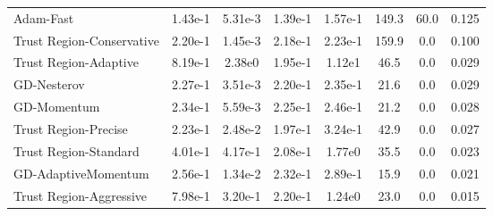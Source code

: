 \documentclass{article}
\begin{document}
\begin{table}[htbp]
{\begin{tabular}{p{2.5cm}*{7}{c}}
Adam-Fast & 1.43e-1 & 5.31e-3 & 1.39e-1 & 1.57e-1 & 149.3 & 60.0 & 0.125 \\
Trust Region-Conservative & 2.20e-1 & 1.45e-3 & 2.18e-1 & 2.23e-1 & 159.9 & 0.0 & 0.100 \\
Trust Region-Adaptive & 8.19e-1 & 2.38e0 & 1.95e-1 & 1.12e1 & 46.5 & 0.0 & 0.029 \\
GD-Nesterov & 2.27e-1 & 3.51e-3 & 2.20e-1 & 2.35e-1 & 21.6 & 0.0 & 0.029 \\
GD-Momentum & 2.34e-1 & 5.59e-3 & 2.25e-1 & 2.46e-1 & 21.2 & 0.0 & 0.028 \\
Trust Region-Precise & 2.23e-1 & 2.48e-2 & 1.97e-1 & 3.24e-1 & 42.9 & 0.0 & 0.027 \\
Trust Region-Standard & 4.01e-1 & 4.17e-1 & 2.08e-1 & 1.77e0 & 35.5 & 0.0 & 0.023 \\
GD-AdaptiveMomentum & 2.56e-1 & 1.34e-2 & 2.32e-1 & 2.89e-1 & 15.9 & 0.0 & 0.021 \\
Trust Region-Aggressive & 7.98e-1 & 3.20e-1 & 2.20e-1 & 1.24e0 & 23.0 & 0.0 & 0.015 \\
\bottomrule
\end{tabular}
}
\end{table}
\end{document}
